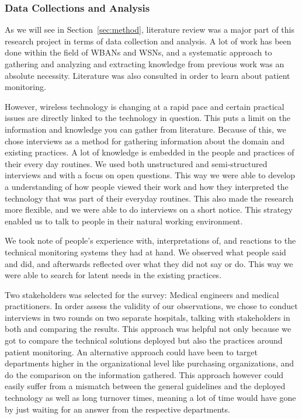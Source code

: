 
\subsubsection{Data Collections and Analysis} %
\label{ssub:data_collections_and_analysis}

As we will see in Section~\ref{sec:method}, literature review was a major part of this research project in terms of data collection and analysis. A lot of work has been done within the field of WBANs and WSNs, and a systematic approach to gathering and analyzing and extracting knowledge from previous work was an absolute necessity. Literature was also consulted in order to learn about patient monitoring.

However, wireless technology is changing at a rapid pace and certain practical issues are directly linked to the technology in question. This puts a limit on the information and knowledge you can gather from literature. Because of this, we chose interviews as a method for gathering information about the domain and existing practices. A lot of knowledge is embedded in the people and practices of their every day routines. We used both unstructured and semi-structured interviews and with a focus on open questions. This way we were able to develop a understanding of how people viewed their work and how they interpreted the technology that was part of their everyday routines. This also made the research more flexible, and we were able to do interviews on a short notice. This strategy enabled us to talk to people in their natural working environment.

We took note of people's experience with, interpretations of, and reactions to the technical monitoring systems they had at hand. We observed what people said and did, and afterwards reflected over what they did not say or do. This way we were able to search for latent needs in the existing practices. 

Two stakeholders was selected for the survey: Medical engineers and medical practitioners. In order assess the validity of our observations, we chose to conduct interviews in two rounds on two separate hospitals, talking with stakeholders in both and comparing the results. This approach was helpful not only because we got to compare the technical solutions deployed but also the practices around patient monitoring. An alternative approach could have been to target departments higher in the organizational level like purchasing organizations, and do the comparison on the information gathered. This approach however could easily suffer from a mismatch between the general guidelines and the deployed technology as well as long turnover times, meaning a lot of time would have gone by just waiting for an answer from the respective departments.



